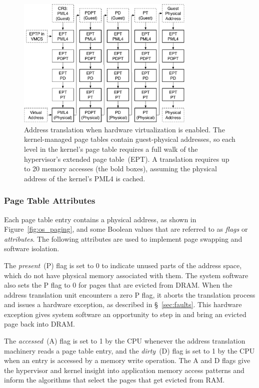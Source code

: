 \begin{figure}[hbt]
  \centering
  \includegraphics[width=85mm]{figures/vmx_paging.pdf}
  \caption{
    Address translation when hardware virtualization is enabled. The
    kernel-managed page tables contain guest-physical addresses, so each level
    in the kernel's page table requires a full walk of the hypervisor's
    extended page table~(EPT).  A translation requires up to 20 memory accesses
    (the bold boxes), assuming the physical address of the kernel's PML4 is
    cached.
  }
  \label{fig:vmx_paging}
\end{figure}


\subsubsection{Page Table Attributes}
\label{sec:page_table_attributes}

Each page table entry contains a physical address, as shown in
Figure~\ref{fig:os_paging}, and some Boolean values that are referred to as
\textit{flags} or \textit{attributes}. The following attributes are used to
implement page swapping and software isolation.

The \textit{present}~(P) flag is set to 0 to indicate unused parts
of the address space, which do not have physical memory associated with them.
The system software also sets the P flag to 0 for pages that are evicted from
DRAM. When the address translation unit encounters a zero P flag, it aborts the
translation process and issues a hardware exception, as described in
\S~\ref{sec:faults}. This hardware exception gives system software an
opportunity to step in and bring an evicted page back into DRAM.

The \textit{accessed}~(A) flag is set to 1 by the CPU whenever the address
translation machinery reads a page table entry, and the \textit{dirty}~(D) flag
is set to 1 by the CPU when an entry is accessed by a memory write operation.
The A and D flags give the hypervisor and kernel insight into application
memory access patterns and inform the algorithms that select the pages that get
evicted from RAM.

